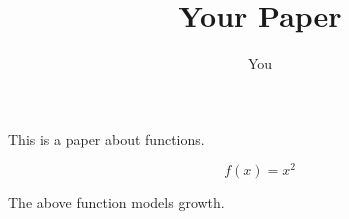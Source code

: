 \documentclass{article}
\title{Your Paper}
\author{You}
\begin{document}
This is a paper about functions.

\[f(x) = x^2\]

The above function models growth.
\end{document}
